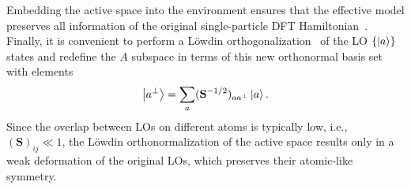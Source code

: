 \documentclass[aps,prx,twocolumn,superscriptaddress]{revtex4-2}
\newcommand{\AV}[1]{{\textcolor{purple}{#1}}}
\begin{document}
Embedding the active space into the environment ensures that the effective model preserves all information of the original single-particle DFT Hamiltonian~\cite{gandusJCP153}. %
Finally, it is convenient to perform a L\"owdin orthogonalization~\cite{lowdin1950non} of the LO $\{\ket{a}\}$ states 
and redefine the $A$ subspace in terms of this new orthonormal basis set 
with elements
\begin{equation}
 \ket{a^\perp} = \sum_a(\mathbf{S}^{-1/2})_{aa^\perp} \ket{a}.
\end{equation}
Since the overlap between LOs on different atoms is typically low, i.e., $(\mathbf{S})_{ij} \ll 1$, 
the L\"owdin orthonormalization of the active space results only in a weak deformation of the original LOs, 
which preserves their atomic-like symmetry. 

\end{document}
